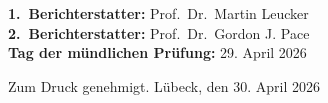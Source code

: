 \documentclass{scrbook}
\begin{document}
  \frontmatter
  
  
  \cleardoublepage
\vspace*{14cm}

\noindent
\textbf{1.~Berichterstatter:} Prof.\ Dr.\ Martin Leucker\\

\noindent
\textbf{2.~Berichterstatter:} Prof.\ Dr.\ Gordon J. Pace\\

\noindent
\textbf{Tag der mündlichen Prüfung:} 29. April 2026\\


\vspace{5mm}

\noindent
Zum Druck genehmigt. Lübeck, den 30. April 2026




  
  

  

  \cleardoublepage
  \markboth{\contentsname}{}
  \tableofcontents


  \mainmatter
  
  
  
  
  

  \appendix


  \backmatter





  
 

  \cleardoublepage
  \printbibliography

  \cleardoublepage
  
  
\end{document}
